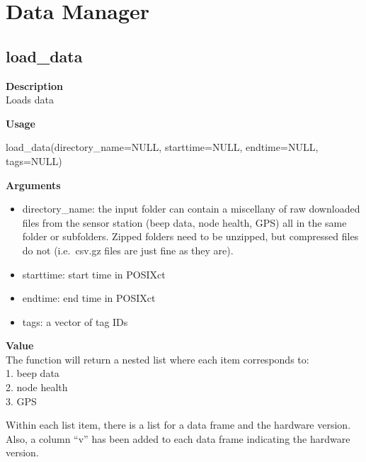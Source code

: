 \documentclass[
]{book}
\newenvironment{Shaded}{\begin{snugshade}}{\end{snugshade}}
\newcommand{\AttributeTok}[1]{\textcolor[rgb]{0.77,0.63,0.00}{#1}}
\newcommand{\ConstantTok}[1]{\textcolor[rgb]{0.00,0.00,0.00}{#1}}
\newcommand{\FunctionTok}[1]{\textcolor[rgb]{0.00,0.00,0.00}{#1}}
\newcommand{\NormalTok}[1]{#1}
\providecommand{\tightlist}{%
  \setlength{\itemsep}{0pt}\setlength{\parskip}{0pt}}
\begin{document}
\hypertarget{data-manager}{%
\section{Data Manager}\label{data-manager}}

\hypertarget{load_data}{%
\subsection{load\_data}\label{load_data}}

\textbf{Description}\\
Loads data

\textbf{Usage}

\begin{Shaded}
\begin{Highlighting}[]
\FunctionTok{load\_data}\NormalTok{(}\AttributeTok{directory\_name=}\ConstantTok{NULL}\NormalTok{, }\AttributeTok{starttime=}\ConstantTok{NULL}\NormalTok{, }\AttributeTok{endtime=}\ConstantTok{NULL}\NormalTok{, }\AttributeTok{tags=}\ConstantTok{NULL}\NormalTok{)  }
\end{Highlighting}
\end{Shaded}

\textbf{Arguments}

\begin{itemize}
\tightlist
\item
  directory\_name: the input folder can contain a miscellany of raw downloaded files from the sensor station (beep data, node health, GPS) all in the same folder or subfolders. Zipped folders need to be unzipped, but compressed files do not (i.e.~csv.gz files are just fine as they are).\\
\item
  starttime: start time in POSIXct\\
\item
  endtime: end time in POSIXct\\
\item
  tags: a vector of tag IDs
\end{itemize}

\textbf{Value}\\
The function will return a nested list where each item corresponds to:\\
1. beep data\\
2. node health\\
3. GPS

Within each list item, there is a list for a data frame and the hardware version. Also, a column ``v'' has been added to each data frame indicating the hardware version.
\end{document}
